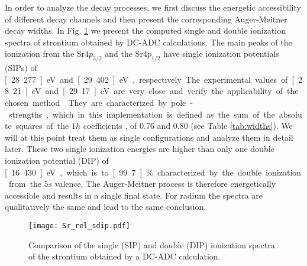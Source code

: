 \documentclass[aps,amssymb,preprint,a4paper,longbibliography]{revtex4}
\begin{document}
In order to analyze the decay processes, we first discuss the energetic
accessibility of different decay channels and then present the corresponding
Auger-Meitner decay widths.
In Fig. \ref{fig:sdip} we present the computed
single and double ionization spectra
of strontium obtained by DC-ADC calculations. The main peaks of the
ionization
from the Sr$4p_{3/2}$ and the Sr$4p_{1/2}$ have single ionization potentials (SIPs)
of \unit[28.277]{eV} and \unit[29.402]{eV}, respectively. The experimental
values of \unit[28.21]{eV} and \unit[29.17]{eV} are very close and
{verify}
the applicability
of the chosen method \cite{Schmitz76}.
They are characterized by pole-strengths, which in this implementation
is defined as
the sum of the absolute squares of the $1h$ coefficients
\cite{Trofimov05}, of 0.76 and 0.80
(see Table \ref{tab:widths}). We will at this point treat them as single
configurations and analyze them in detail later.
These two single ionization energies are higher
than only one double ionization potential (DIP) of \unit[16.430]{eV},
which is to \unit[99.7]{\%} characterized by the double ionization from
the $5s$ valence. The Auger-Meitner process is therefore energetically accessible and
results in a single final state.
For radium the spectra are qualitatively the same and
lead to the same conclusion.

\begin{figure}[h]
 \centering
 \texttt{[image: Sr\_rel\_sdip.pdf]}
 \caption{Comparison of the single (SIP) and double (DIP) ionization spectra
          of the strontium obtained by a DC-ADC calculation.}
 \label{fig:sdip}
\end{figure}
\end{document}
